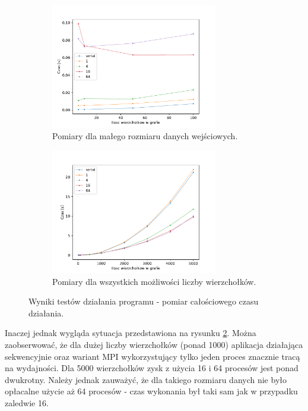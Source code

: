 \documentclass[12pt]{article}
\begin{document}
\begin{figure}[H]
\centering

\begin{subfigure}{\textwidth}
\centering
\includegraphics[width=0.8\textwidth]{static/total_times_begin.pdf}
\caption{Pomiary dla małego rozmiaru danych wejściowych.}
\label{fig:testall1}
\end{subfigure}

\begin{subfigure}{\textwidth}
\centering
\includegraphics[width=0.8\textwidth]{static/total_times.pdf} 
\caption{Pomiary dla wszystkich możliwości liczby wierzchołków.}
\label{fig:testall2}
\end{subfigure}

\caption{Wyniki testów działania programu - pomiar całościowego czasu działania.}
\label{fig:testall}
\end{figure}

Inaczej jednak wygląda sytuacja przedstawiona na rysunku \ref{fig:testall2}. Można zaobserwować, że dla dużej liczby wierzchołków (ponad 1000) aplikacja działająca sekwencyjnie oraz wariant MPI wykorzystujący tylko jeden proces znacznie tracą na wydajności. Dla 5000 wierzchołków zysk z użycia 16 i 64 procesów jest ponad dwukrotny. Należy jednak zauważyć, że dla takiego rozmiaru danych nie było opłacalne użycie aż 64 procesów - czas wykonania był taki sam jak w przypadku zaledwie 16.
\end{document}
